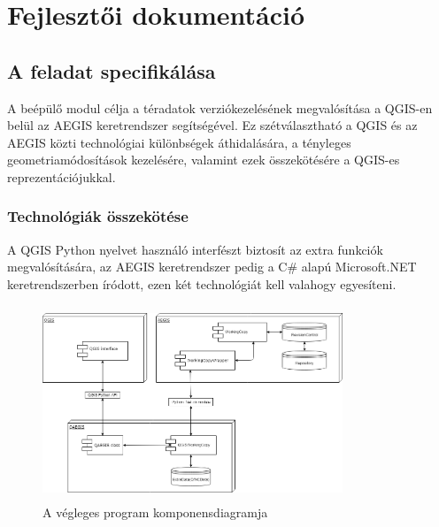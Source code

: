 \chapter{Fejlesztői dokumentáció}
\label{ch:impl}

\section{A feladat specifikálása}
A beépülő modul célja a téradatok verziókezelésének megvalósítása a QGIS-en belül az AEGIS keretrendszer segítségével. Ez szétválasztható a QGIS és az AEGIS közti technológiai különbségek áthidalására, a tényleges geometriamódosítások kezelésére, valamint ezek összekötésére a QGIS-es reprezentációjukkal.

\subsection{Technológiák összekötése}
A QGIS Python nyelvet használó interfészt biztosít az extra funkciók megvalósítására, az AEGIS keretrendszer pedig a C\# alapú Microsoft.NET keretrendszerben íródott, ezen két technológiát kell valahogy egyesíteni.

\begin{figure}[H]
	\centering
	\includegraphics[width=0.8\textwidth,height=220px]{images/qaegis_component_diagram.png}
	\caption{A végleges program komponensdiagramja}
	\label{fig:picture-7}
\end{figure}

